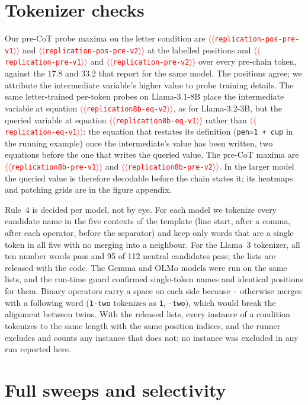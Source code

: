 \documentclass[11pt]{article}
\providecommand{\NUM}[1]{\textcolor{red}{$\langle\langle$\texttt{#1}$\rangle\rangle$}}
\begin{document}
\section{Tokenizer checks}
\label{app:tok}
Our pre-CoT probe maxima on the letter condition are \NUM{replication-pos-pre-v1} and
\NUM{replication-pos-pre-v2} at the labelled positions and \NUM{replication-pre-v1} and
\NUM{replication-pre-v2} over every pre-chain token, against the 17.8 and 33.2 that
\citet{kudo2026faithful} report for the same model. The positions agree; we attribute the
intermediate variable's higher value to probe training details.
The same letter-trained per-token probes on Llama-3.1-8B place the intermediate variable at
equation \NUM{replication8b-eq-v2}, as for Llama-3.2-3B, but the queried variable at equation
\NUM{replication8b-eq-v1} rather than \NUM{replication-eq-v1}: the equation that restates its
definition (\texttt{pen=1 + cup} in the running example) once the intermediate's value has been
written, two equations before the one that writes the queried value. The pre-CoT maxima are
\NUM{replication8b-pre-v1} and \NUM{replication8b-pre-v2}. In the larger model the queried value
is therefore decodable before the chain states it; its heatmaps and patching grids are in the
figure appendix.

Rule~4 is decided per model, not by eye. For each model we tokenize every candidate name in the
five contexts of the template (line start, after a comma, after each operator, before the
separator) and keep only words that are a single token in all five with no merging into a
neighbour. For the Llama~3 tokenizer, all ten number words pass and 95 of 112 neutral candidates
pass; the lists are released with the code. The Gemma and OLMo models were run on the same
lists, and the run-time guard confirmed single-token names and identical positions for them. Binary operators carry a space on each side because
\texttt{-} otherwise merges with a following word (\texttt{1-two} tokenizes as \texttt{1},
\texttt{-two}), which would break the alignment between twins. With the released lists, every
instance of a condition tokenizes to the same length with the same position indices, and the
runner excludes and counts any instance that does not; no instance was excluded in any run
reported here.

\section{Full sweeps and selectivity}
\label{app:sweeps}
\end{document}
